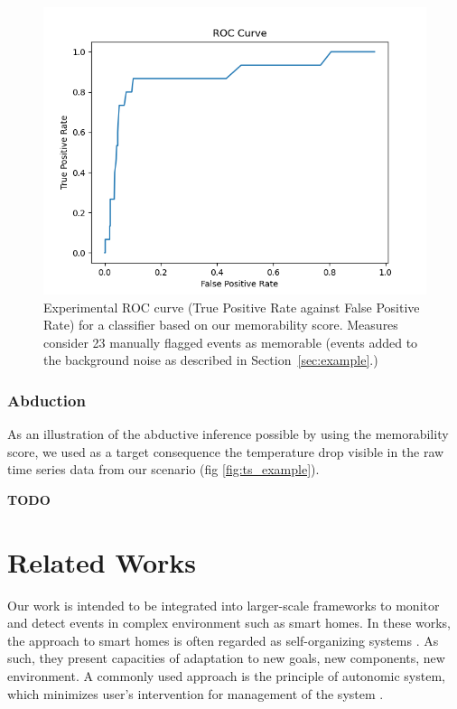 \documentclass[conference]{IEEEtran}
\begin{document}
\begin{figure}[ht]
  \centering
  \includegraphics[width=\linewidth]{./figures/roc}
  \caption{Experimental ROC curve (True Positive Rate against False Positive
   Rate) for a classifier based on our memorability score. Measures consider 23
   manually flagged events as memorable (events added to the background noise
   as described in Section~\ref{sec:example}.)}
  \label{fig:roc}
\end{figure}
\subsubsection{Abduction}

As an illustration of the abductive inference possible by using the memorability
score, we used as a target consequence the temperature drop visible in the raw
time series data from our scenario (fig \ref{fig:ts_example}).

\textbf{TODO}

\section{Related Works}
\label{sec:related}
Our work is intended to be integrated into larger-scale frameworks to monitor 
and detect events in complex environment such as smart homes. In these works, the
approach to smart homes is often regarded as self-organizing systems \cite{kramer_rigorous_2009,kounev_notion_2017}. As such, they present capacities of adaptation to new goals, 
new components, new environment. A commonly used approach is the principle of 
autonomic system, which minimizes user's intervention for management of the 
system \cite{kounev_notion_2017,kephart_vision_2003}.
\end{document}
